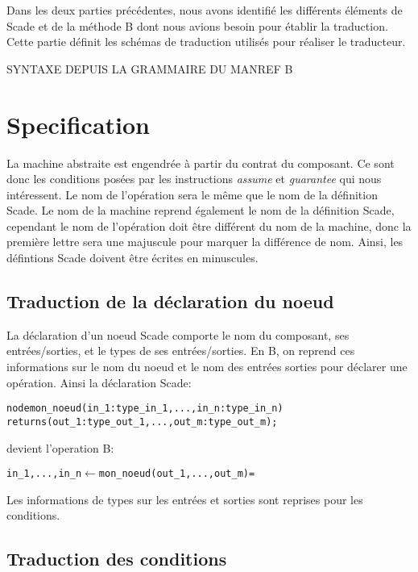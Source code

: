 


Dans les deux parties précédentes, nous avons identifié les différents
éléments de Scade et de la méthode B dont nous avions besoin pour
établir la traduction. Cette partie définit les schémas de traduction
utilisés pour réaliser le traducteur.

SYNTAXE DEPUIS LA GRAMMAIRE DU MANREF B

\section{Specification}

La machine abstraite est engendrée à partir du contrat du composant. Ce sont
donc les conditions posées par les instructions \emph{assume} et
\emph{guarantee} qui nous intéressent. Le nom de l'opération sera le même que le
nom de la définition Scade. Le nom de la machine reprend également le nom de la
définition Scade, cependant le nom de l'opération doit être différent du nom de
la machine, donc la première lettre sera une majuscule pour marquer la
différence de nom. Ainsi, les défintions Scade doivent être écrites en
minuscules.

\subsection{Traduction de la déclaration du noeud}
La déclaration d'un noeud Scade comporte le nom du composant, ses
entrées/sorties, et le types de ses entrées/sorties. En B, on reprend ces
informations sur le nom du noeud et le nom des entrées sorties pour déclarer une
opération. Ainsi la déclaration Scade: 
\begin{alltt}
node mon\_noeud (in_1: type\_in_1, ..., in_n: type\_in_n) 
                returns (out_1: type\_out_1, ..., out_m: type\_out_m);
\end{alltt}
devient l'operation B:
\begin{alltt}
in_1, ..., in_n \(\leftarrow\) mon\_noeud(out_1, ..., out_m) =
\end{alltt}

Les informations de types sur les entrées et sorties sont reprises pour les
conditions.


\subsection{Traduction des conditions}

